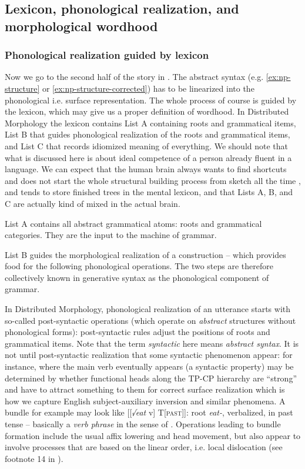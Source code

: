 \documentclass[a4paper, oneside, scheme=plain, 12pt]{article}
\newcommand*{\term}[1]{\emph{#1}}
\newcommand{\form}[1]{\emph{#1}}
\newcommand*{\category}[1]{\textsc{#1}}
\begin{document}
\subsection{Lexicon, phonological realization, and morphological wordhood}\label{sec:vocabulary-inesrtion}

\subsubsection{Phonological realization guided by lexicon}\label{sec:realization}

Now we go to the second half of the story in .
The abstract syntax (e.g. \ref{ex:np-structure} or \ref{ex:np-structure-corrected})
has to be linearized into the phonological i.e. surface representation.
The whole process of course is guided by the lexicon,
which may give us a proper definition of wordhood.
In Distributed Morphology the lexicon contains List A containing roots and grammatical items,
List B that guides phonological realization of the roots and grammatical items,
and List C that records idiomized meaning of everything.
We should note that what is discussed here is about ideal competence of a person already fluent in a language.
We can expect that the human brain always wants to find shortcuts
and does not start the whole structural building process from sketch all the time \citep{matchin2020cortical},
and tends to store finished trees in the mental lexicon,
and that Lists A, B, and C are actually kind of mixed in the actual brain. 

List A contains all abstract grammatical atoms:
roots and grammatical categories.
They are the input to the machine of grammar.


List B guides the morphological realization of a construction --
which provides food for the following phonological operations.
The two steps are therefore collectively known in generative syntax as the phonological component of grammar.

In Distributed Morphology, phonological realization of an utterance starts with so-called post-syntactic operations (which operate on \emph{abstract} structures without phonological forms):
post-syntactic rules adjust the positions of roots and grammatical items.
Note that the term \term{syntactic} here means \emph{abstract syntax}.
It is not until post-syntactic realization that some syntactic phenomenon appear:
for instance, where the main verb eventually appears (a syntactic property) may be determined by
whether functional heads along the TP-CP hierarchy are ``strong''
and have to attract something to them for correct surface realization
which is how we capture English subject-auxiliary inversion and similar phenomena.
A bundle for example may look like [[\form{√eat} v] T[\category{past}]]:
root \form{eat-}, verbalized, in past tense -- basically a \term{verb phrase}
in the sense of .
Operations leading to bundle formation include the usual affix lowering and head movement,
but also appear to involve processes that are based on the linear order, i.e. local dislocation (see footnote 14 in \citealt{embick2007linearization}).
\end{document}
